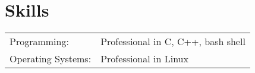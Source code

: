 \documentclass[a4paper,10pt]{article}
\begin{document}
\section{Skills}
\begin{tabular}{ll}
Programming:& Professional in C, C++, bash shell \\%
Operating Systems: & Professional in Linux %
\end{tabular}






\end{document}
